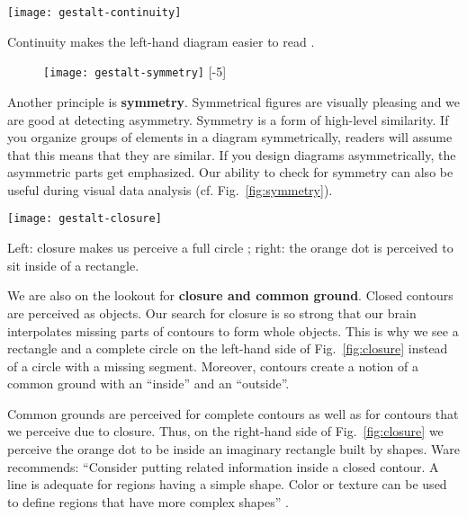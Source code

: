 \begin{marginfigure}
\centering
\texttt{[image: gestalt-continuity]}
\caption{\label{fig:continuity} Continuity makes the left-hand diagram easier to read \cite{Ware12}.}%
\end{marginfigure}

\begin{figure}
\centering
\texttt{[image: gestalt-symmetry]}
[-5\baselineskip]
\end{figure}

Another principle is \textbf{symmetry}. Symmetrical figures are visually pleasing and we are good at detecting asymmetry. Symmetry is a form of high-level similarity. If you organize groups of elements in a diagram symmetrically, readers will assume that this means that they are similar. If you design diagrams asymmetrically, the asymmetric parts get emphasized. Our ability to check for symmetry can also be useful during visual data analysis (cf. Fig.~\ref{fig:symmetry}).

\begin{marginfigure}
\centering
\texttt{[image: gestalt-closure]}
\caption{\label{fig:closure} Left: closure makes us perceive a full circle \cite{Ware12}; right: the orange dot is perceived to sit inside of a rectangle.}%
\end{marginfigure}

We are also on the lookout for \textbf{closure and common ground}. Closed contours are perceived as objects. Our search for closure is so strong that our brain interpolates missing parts of contours to form whole objects. This is why we see a rectangle and a complete circle on the left-hand side of Fig.~\ref{fig:closure} instead of a circle with a missing segment. Moreover, contours create a notion of a common ground with an ``inside'' and an ``outside''.

Common grounds are perceived for complete contours as well as for contours that we perceive due to closure. Thus, on the right-hand side of Fig.~\ref{fig:closure} we perceive the orange dot to be inside an imaginary rectangle built by shapes. Ware recommends: ``Consider putting related information inside a closed contour. A line is adequate for regions having a simple shape. Color or texture can be used to define regions that have more complex shapes'' \cite{Ware12}.

